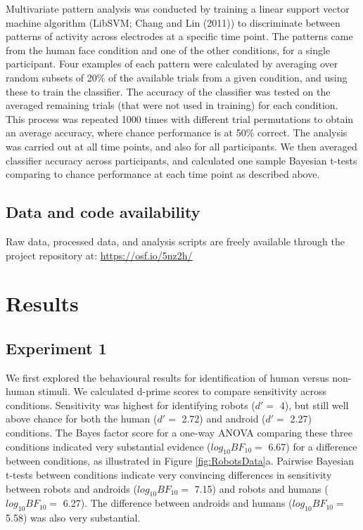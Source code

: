 \documentclass[
]{article}
\begin{document}
Multivariate pattern analysis was conducted by training a linear support vector machine algorithm (LibSVM; Chang and Lin (2011)) to discriminate between patterns of activity across electrodes at a specific time point. The patterns came from the human face condition and one of the other conditions, for a single participant. Four examples of each pattern were calculated by averaging over random subsets of 20\% of the available trials from a given condition, and using these to train the classifier. The accuracy of the classifier was tested on the averaged remaining trials (that were not used in training) for each condition. This process was repeated 1000 times with different trial permutations to obtain an average accuracy, where chance performance is at 50\% correct. The analysis was carried out at all time points, and also for all participants. We then averaged classifier accuracy across participants, and calculated one sample Bayesian t-tests comparing to chance performance at each time point as described above.

\hypertarget{data-and-code-availability}{%
\subsection{Data and code availability}\label{data-and-code-availability}}

Raw data, processed data, and analysis scripts are freely available through the project repository at: \url{https://osf.io/5nz2h/}

\hypertarget{results}{%
\section{Results}\label{results}}

\hypertarget{experiment-1}{%
\subsection{Experiment 1}\label{experiment-1}}

We first explored the behavioural results for identification of human versus non-human stimuli. We calculated d-prime scores to compare sensitivity across conditions. Sensitivity was highest for identifying robots (\(d' =\) 4), but still well above chance for both the human (\(d' =\) 2.72) and android (\(d' =\) 2.27) conditions. The Bayes factor score for a one-way ANOVA comparing these three conditions indicated very substantial evidence (\(log_{10}BF_{10} =\) 6.67) for a difference between conditions, as illustrated in Figure \ref{fig:RobotsData}a. Pairwise Bayesian t-tests between conditions indicate very convincing differences in sensitivity between robots and androids (\(log_{10}BF_{10} =\) 7.15) and robots and humans (\(log_{10}BF_{10} =\) 6.27). The difference between androids and humans (\(log_{10}BF_{10} =\) 5.58) was also very substantial.
\end{document}
